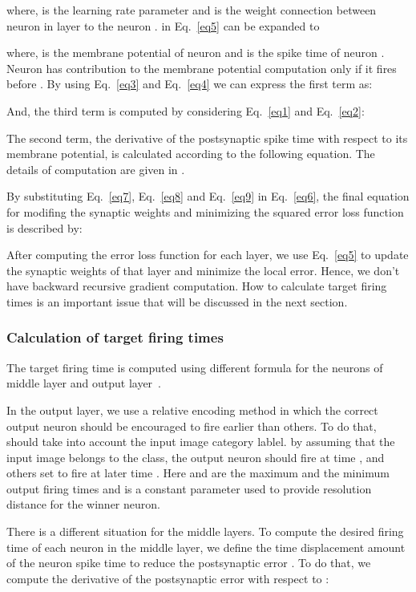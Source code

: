 \documentclass[preprint,twocolumn,5p,12pt]{article}
\begin{document}
where,  is the learning rate parameter and  is the weight connection between neuron  in layer  to the neuron .
 in Eq.~\ref{eq5} can be expanded to

where,  is the membrane potential of neuron  and  is the spike time of neuron . Neuron  has contribution to the membrane potential computation only if it fires before .
By using Eq.~\ref{eq3} and Eq.~\ref{eq4} we can express the first term as:

And, the third term is computed by considering Eq.~\ref{eq1} and Eq.~\ref{eq2}:


The second term, the derivative of the postsynaptic spike time with respect to its membrane potential, is calculated according to the following equation.
The details of computation are given in \cite{R3}.


By substituting Eq.~\ref{eq7}, Eq.~\ref{eq8} and Eq.~\ref{eq9} in Eq.~\ref{eq6}, the final equation for modifing the synaptic weights and minimizing the squared error loss function  is described by:


After computing the error loss function for each layer, we use Eq.~\ref{eq5} to update the synaptic weights of that layer and minimize the local error. Hence, we don't have backward recursive gradient computation. 
How to calculate target firing times is an important issue that will be discussed in the next section.

\subsubsection{Calculation of target firing times}
The target firing time is computed using different formula for the neurons of middle layer and output layer~\cite{R3}. 

In the output layer, we use a relative encoding method in which the correct output neuron should be encouraged to fire earlier than others. 
To do that, should take into account the input image category lablel. 
by assuming that the input image belongs to the  class, the  output neuron should fire at time , and others set to fire at later time .
Here  and  are the maximum and the minimum output firing times and  is a constant parameter used to provide resolution distance for the winner neuron.

There is a different situation for the middle layers. 
To compute the desired firing time of each neuron  in the  middle layer, we define the time displacement amount of the neuron spike time  to reduce the postsynaptic error . 
To do that, we compute the derivative of the postsynaptic error with respect to :
\end{document}
